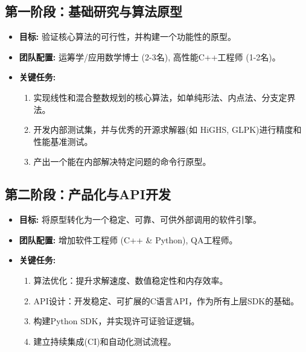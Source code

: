 \documentclass[a4paper, 12pt]{article}
\begin{document}
\subsection{第一阶段：基础研究与算法原型}
\begin{itemize}
    \item \textbf{目标:} 验证核心算法的可行性，并构建一个功能性的原型。
    \item \textbf{团队配置:} 运筹学/应用数学博士 (2-3名), 高性能C++工程师 (1-2名)。
    \item \textbf{关键任务:}
        \begin{enumerate}
            \item 实现线性和混合整数规划的核心算法，如单纯形法、内点法、分支定界法。
            \item 开发内部测试集，并与优秀的开源求解器(如 HiGHS, GLPK)进行精度和性能基准测试。
            \item 产出一个能在内部解决特定问题的命令行原型。
        \end{enumerate}
\end{itemize}

\subsection{第二阶段：产品化与API开发}
\begin{itemize}
    \item \textbf{目标:} 将原型转化为一个稳定、可靠、可供外部调用的软件引擎。
    \item \textbf{团队配置:} 增加软件工程师 (C++ \& Python), QA工程师。
    \item \textbf{关键任务:}
        \begin{enumerate}
            \item 算法优化：提升求解速度、数值稳定性和内存效率。
            \item API设计：开发稳定、可扩展的C语言API，作为所有上层SDK的基础。
            \item 构建Python SDK，并实现许可证验证逻辑。
            \item 建立持续集成(CI)和自动化测试流程。
        \end{enumerate}
\end{itemize}
\end{document}
